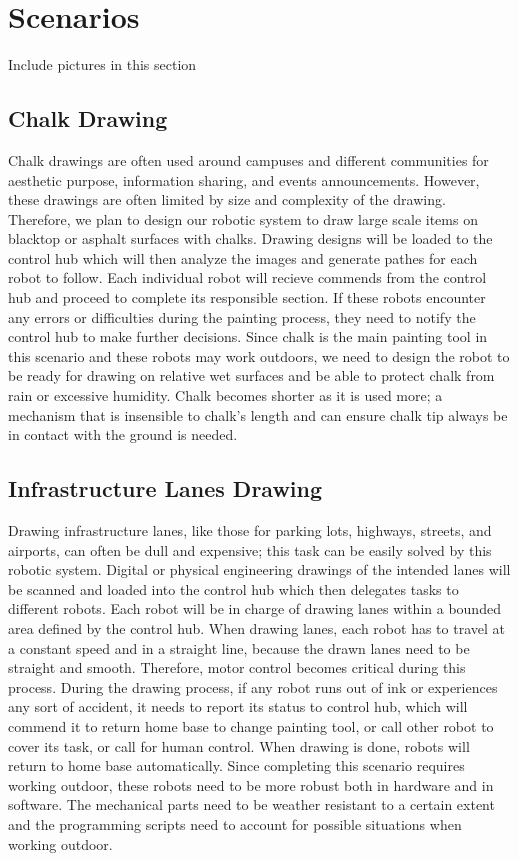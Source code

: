 
\section{Scenarios}
\label{sec:scenarios}
Include pictures in this section

\subsection{Chalk Drawing}
Chalk drawings are often used around campuses and different communities for aesthetic purpose, information sharing, and events announcements. However, these drawings are often limited by size and complexity of the drawing. Therefore, we plan to design our robotic system to draw large scale items on blacktop or asphalt surfaces with chalks. Drawing designs will be loaded to the control hub which will then analyze the images and generate pathes for each robot to follow. Each individual robot will recieve commends from the control hub and proceed to complete its responsible section. If these robots encounter any errors or difficulties during the painting process, they need to notify the control hub to make further decisions. Since chalk is the main painting tool in this scenario and these robots may work outdoors, we need to design the robot to be ready for drawing on relative wet surfaces and be able to protect chalk from rain or excessive humidity. Chalk becomes shorter as it is used more; a mechanism that is insensible to chalk's length and can ensure chalk tip always be in contact with the ground is needed. 

\subsection{Infrastructure Lanes Drawing}
Drawing infrastructure lanes, like those for parking lots, highways, streets, and airports, can often be dull and expensive; this task can be easily solved by this robotic system. Digital or physical engineering drawings of the intended lanes will be scanned and loaded into the control hub which then delegates tasks to different robots. Each robot will be in charge of drawing lanes within a bounded area defined by the control hub. When drawing lanes, each robot has to travel at a constant speed and in a straight line, because the drawn lanes need to be straight and smooth. Therefore, motor control becomes critical during this process. During the drawing process, if any robot runs out of ink or experiences any sort of accident, it needs to report its status to control hub, which will commend it to return home base to change painting tool, or call other robot to cover its task, or call for human control. When drawing is done, robots will return to home base automatically. Since completing this scenario requires working outdoor, these robots need to be more robust both in hardware and in software. The mechanical parts need to be weather resistant to a certain extent and the programming scripts need to account for possible situations when working outdoor. 

